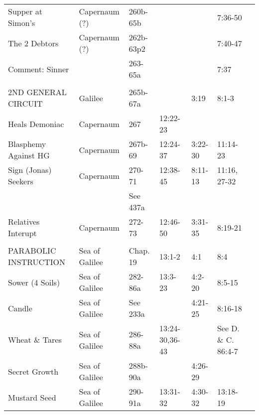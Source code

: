 \begin{longtable}[h]{lllllll}
Supper at Simon's                  & Capernaum (?)       & 260b-65b   &                 &                 & 7:36-50              & \\
\quad The 2 Debtors                & Capernaum (?)       & 262b-63p2  &                 &                 & 7:40-47              & \\
\quad Comment: Sinner              &                     & 263-65a    &                 &                 & 7:37                 & \\
\\
2ND GENERAL CIRCUIT                & Galilee             & 265b-67a   &                 & 3:19            & 8:1-3                & \\
Heals Demoniac                     & Capernaum           & 267        & 12:22-23        &                 &                      & \\
Blasphemy Against HG               & Capernaum           & 267b-69    & 12:24-37        & 3:22-30         & 11:14-23             & \\
Sign (Jonas) Seekers               & Capernaum           & 270-71     & 12:38-45        & 8:11-13         & 11:16, 27-32         & \\
                                   &                     & See 437a   &                 &                 &                      & \\
Relatives Interupt                 & Capernaum           & 272-73     & 12:46-50        & 3:31-35         & 8:19-21              & \\
\\
PARABOLIC INSTRUCTION              & Sea of Galilee      & Chap. 19   & 13:1-2          & 4:1             & 8:4                  & \\
\quad Sower (4 Soils)              & Sea of Galilee      & 282-86a    & 13:3-23         & 4:2-20          & 8:5-15               & \\
\quad Candle                       & Sea of Galilee      & See 233a   &                 & 4:21-25         & 8:16-18              & \\
\quad Wheat \& Tares               & Sea of Galilee      & 286-88a    & 13:24-30,36-43  &                 & See D. \& C. 86:4-7  & \\
\quad Secret Growth                & Sea of Galilee      & 288b-90a   &                 & 4:26-29         &                      & \\
\quad Mustard Seed                 & Sea of Galilee      & 290-91a    & 13:31-32        & 4:30-32         & 13:18-19             & \\

\end{longtable}

